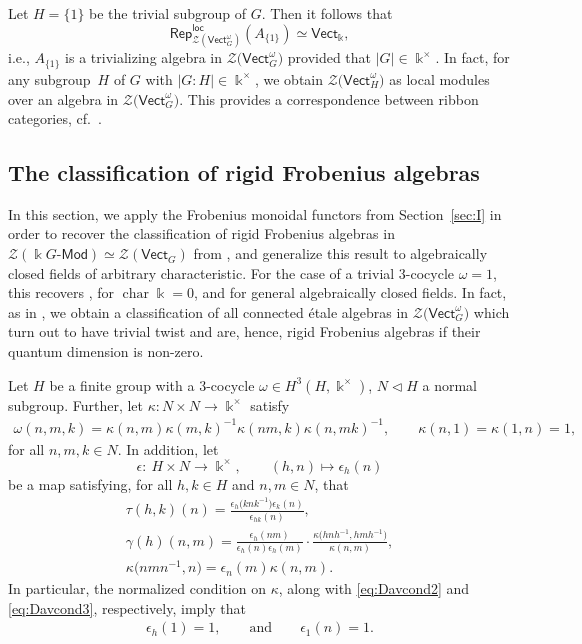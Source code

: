 \documentclass[10pt,a4paper]{amsart}
\numberwithin{equation}{section}
\newcommand{\lmod}[1]{#1\text{-}\mathsf{Mod}}
\newcommand{\cha}{\operatorname{char}}
\newcommand{\locmod}{\mathsf{Rep}^{\mathsf{loc}}}
\newcommand{\Vect}{\mathsf{Vect}}
\newcommand{\cZ}{\mathcal{Z}}
\begin{document}
\begin{Example}
Let $H=\{1\}$ be the trivial subgroup of $G$. Then it follows that \[\locmod_{\cZ(\Vect_G^\omega)}(A_{\{1\}})\simeq \Vect_{\Bbbk},\]
i.e., $A_{\{1\}}$ is a trivializing algebra in $\cZ\big(\Vect_G^\omega\big)$ provided that $|G|\in \Bbbk^\times$. In fact, for any subgroup~$H$ of $G$ with $|G:H|\in \Bbbk^\times$, we obtain $\cZ\big(\Vect_H^\omega\big)$ as local modules over an algebra in $\cZ\big(\Vect_G^\omega\big)$. This provides a correspondence between ribbon categories, cf.\ \cite[Section~1.4]{FFRS}.
\end{Example}



\subsection{The classification of rigid Frobenius algebras}

In this section, we apply the Frobenius monoidal functors from Section~\ref{sec:I} in order to recover the classification of rigid Frobenius algebras in $\cZ(\lmod{\Bbbk G})\simeq \cZ(\Vect_G)$ from \cite[Theorem 3.15]{DS}, and generalize this result to algebraically closed fields of arbitrary characteristic. For the case of a trivial $3$-cocycle $\omega=1$, this recovers \cite[Theorem~3.5.1]{Dav3}, for $\cha \Bbbk=0$, and \cite[Theorem~6.14]{LW3} for general algebraically closed fields. In fact, as in \cite{DS}, we obtain a classification of all connected \'etale algebras in $\cZ\big(\Vect_G^\omega\big)$ which turn out to have trivial twist and are, hence, rigid Frobenius algebras if their quantum dimension is non-zero.

\begin{Notation} \label{not:cocycledata}
Let $H$ be a finite group with a $3$-cocycle $\omega\in H^3(H,\Bbbk^\times)$, $N\triangleleft H$ a normal subgroup.
Further, let $\kappa \colon N\times N\to \Bbbk^\times$ satisfy
\begin{align}\label{eq:tau}
 \omega(n,m,k) =\kappa(n,m)\kappa(m,k)^{-1}\kappa(nm,k)\kappa(n,mk)^{-1}, \qquad \kappa(n,1)=\kappa(1,n)=1,
\end{align}
for all $n,m,k\in N$. In addition, let
\[\epsilon\colon\ H\times N\to \Bbbk^\times, \qquad (h,n)\mapsto \epsilon_h(n)\]
be a map satisfying, for all $h,k\in H$ and $n,m\in N$, that
\begin{gather}
 \tau(h,k)(n)=\frac{\epsilon_h\big(knk^{-1}\big)\epsilon_k(n)}{\epsilon_{hk}(n)}, \label{eq:Davcond1}\\
 \gamma(h)(n,m)=\frac{\epsilon_h(nm)}{\epsilon_h(n)\epsilon_h(m)}\cdot\frac{\kappa\big(hnh^{-1},hmh^{-1}\big)}{\kappa(n,m)}, \label{eq:Davcond2}\\
 \kappa\big(nmn^{-1},n\big)=\epsilon_n(m)\kappa(n,m).
 \label{eq:Davcond3}
\end{gather}
In particular, the normalized condition on $\kappa$, along with \eqref{eq:Davcond2} and \eqref{eq:Davcond3}, respectively, imply that
\begin{align*}
 \epsilon_{h}(1) = 1, \qquad \text{and} \qquad \epsilon_{1}(n) = 1. %
\end{align*}
\end{Notation}
\end{document}
